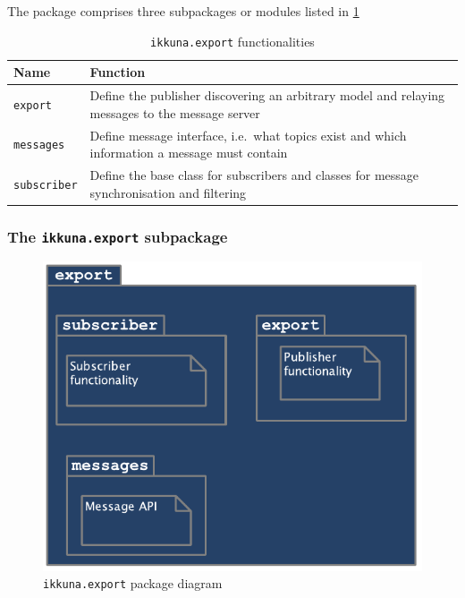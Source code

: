 The package comprises three subpackages or modules listed in
\cref{tbl:ikkuna.export}

\begin{table}
    \caption{\texttt{ikkuna.export} functionalities}
    \label{tbl:ikkuna.export}
    \begin{tabularx}{\textwidth}{lX}
        \toprule
        Name                & Function\tabularnewline
        \midrule
        \texttt{export}     & Define the publisher discovering an arbitrary model and relaying messages to the message server\tabularnewline
        \texttt{messages}   & Define message interface, i.e.~what topics exist and which information a message must contain\tabularnewline
        \texttt{subscriber} & Define the base class for subscribers and classes for message synchronisation and filtering\tabularnewline
        \bottomrule
    \end{tabularx}
\end{table}

\subsubsection*{The \texttt{ikkuna.export} subpackage}

\begin{figure}
    \hypertarget{fig:pack-diag-export}{%
        \centering
        \includegraphics[max width=.7\textwidth]{gfx/diagrams/class_diagrams/export_package_diagram.pdf}
        \caption{\texttt{ikkuna.export} package diagram}\label{fig:pack-diag-export}
    }
\end{figure}

